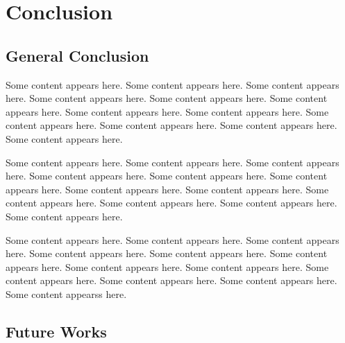 \chapter{Conclusion }
\label{sec:conclusion}


\section{General Conclusion}
Some content appears here. Some content appears here. Some content appears here. Some content appears here. Some content appears here. Some content appears here.
Some content appears here. Some content appears here. Some content appears here.
Some content appears here. Some content appears here. Some content appears here.
    
    \medskip
    
Some content appears here. Some content appears here. Some content appears here. Some content appears here. Some content appears here. Some content appears here.
Some content appears here. Some content appears here. Some content appears here.
Some content appears here. Some content appears here. Some content appears here.
    
    \medskip
    
   Some content appears here. Some content appears here. Some content appears here. Some content appears here. Some content appears here. Some content appears here.
Some content appears here. Some content appears here. Some content appears here.
Some content appears here. Some content appears here. Some content appearss here.

\section{Future Works}